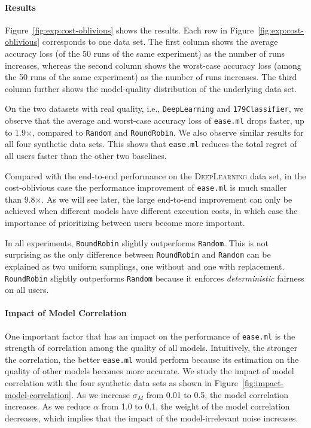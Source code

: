 \documentclass[letterpaper]{vldb}
\newcommand{\eml}{\texttt{ease.ml}\xspace}
\begin{document}
\paragraph*{Results}
Figure~\ref{fig:exp:cost-oblivious} shows the 
results. Each row in Figure~\ref{fig:exp:cost-oblivious} corresponds
to one data set.
The first column shows the average accuracy loss (of the 50 runs of the same experiment) as the number of runs increases, whereas the second column shows the worst-case accuracy loss (among the 50 runs of the same experiment) as the number of runs increases.
The third column further shows the model-quality distribution of the underlying data set.

On the two datasets with real
quality, i.e., \texttt{DeepLearning} and 
\texttt{179Classifier}, we observe that the 
average and worst-case accuracy loss of \eml 
drops faster, up to 1.9$\times$,
compared to \texttt{Random} and 
\texttt{RoundRobin}. We also observe
similar results for all four synthetic data sets.
This shows that \eml reduces the total regret 
of all users faster than the other two baselines.

Compared with the end-to-end performance
on the \textsc{DeepLearning} data set,
in the cost-oblivious case the performance
improvement of \eml is much smaller than
9.8$\times$. As we will see later, the 
large end-to-end improvement can only be
achieved when different models have different
execution costs, in which case the importance
of prioritizing between users become
more important.

In all experiments, \texttt{RoundRobin} 
slightly outperforms \texttt{Random}. This is not 
surprising as the only difference
between \texttt{RoundRobin} and 
\texttt{Random} can be explained as two
uniform samplings, one without and one with replacement.
\texttt{RoundRobin} slightly outperforms
\texttt{Random}
because it enforces {\em deterministic} 
fairness on all users.

\paragraph*{Impact of Model Correlation}

One important factor that has an impact on
the performance of \eml is the strength
of correlation among the quality of all models.
Intuitively, the stronger the correlation,
the better \eml would perform because its
estimation on the quality of other models
becomes more accurate. We study the
impact of model correlation with the
four synthetic data sets
as shown in Figure~\ref{fig:impact-model-correlation}.
As we increase $\sigma_M$ from 0.01 to 0.5, the 
model correlation increases. As we reduce $\alpha$ from 1.0 to 0.1, the weight of the model correlation decreases, which implies that the impact of the model-irrelevant noise increases.
\end{document}
